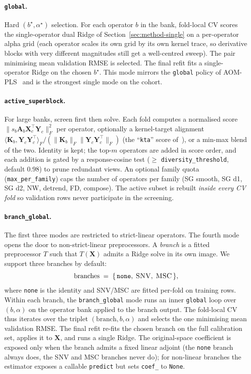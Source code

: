 \documentclass[11pt,a4paper]{article}
\newcommand{\Xmat}{\mathbf{X}}
\newcommand{\Yc}{\mathbf{Y}_{\!c}}
\newcommand{\Amat}{\mathbf{A}}
\newcommand{\Kmat}{\mathbf{K}}
\newcommand{\SNV}{\textsc{SNV}\xspace}
\newcommand{\MSC}{\textsc{MSC}\xspace}
\begin{document}
\paragraph{\texttt{global}.}
Hard $(b^\star,\alpha^\star)$ selection. For each operator $b$ in the
bank, fold-local CV scores the single-operator dual Ridge of
Section~\ref{sec:method-single} on a per-operator alpha grid (each
operator scales its own grid by its own kernel trace, so derivative
blocks with very different magnitudes still get a well-centred sweep).
The pair minimising mean validation RMSE is selected. The final refit
fits a single-operator Ridge on the chosen $b^\star$. This mode
mirrors the \texttt{global} policy of AOM-PLS~\citep{beurier2026aompls}
and is the strongest single mode on the cohort.

\paragraph{\texttt{active\_superblock}.}
For large banks, screen first then solve. Each fold computes a
normalised score
$\|s_b\Amat_b\Xmat_c^\top\Yc\|_F^2$ per operator, optionally a
kernel-target alignment
$\langle\Kmat_b,\Yc\Yc^\top\rangle_F/(\|\Kmat_b\|_F\|\Yc\Yc^\top\|_F)$
(the ``\texttt{kta}'' score
of~\citealt{cristianini2002kernel}), or a min-max blend of the two.
Identity is kept; the top-$m$ operators are added in score order, and
each addition is gated by a response-cosine test
($\geq$ \texttt{diversity\_threshold}, default $0.98$) to prune
redundant views. An optional family quota
(\texttt{max\_per\_family}) caps the number of operators per family
(SG smooth, SG d1, SG d2, NW, detrend, FD, compose). The active
subset is rebuilt \emph{inside every CV fold} so validation rows
never participate in the screening.

\paragraph{\texttt{branch\_global}.}
The first three modes are restricted to strict-linear operators. The
fourth mode opens the door to non-strict-linear preprocessors. A
\emph{branch} is a fitted preprocessor $T$ such that $T(\Xmat)$
admits a Ridge solve in its own image. We support three branches by
default:
\begin{equation}
\mathrm{branches} \;=\; \{\,\texttt{none},\;\SNV,\;\MSC\,\},
\end{equation}
where \texttt{none} is the identity and \SNV/\MSC are fitted
per-fold on training rows. Within each branch, the
\texttt{branch\_global} mode runs an inner \texttt{global} loop over
$(b,\alpha)$ on the operator bank applied to the branch output. The
fold-local CV thus iterates over the triplet
$(\mathrm{branch},b,\alpha)$ and selects the one minimising mean
validation RMSE. The final refit re-fits the chosen branch on the
full calibration set, applies it to $\Xmat$, and runs a single Ridge.
The original-space coefficient is exposed only when the branch admits
a fixed linear adjoint (the \texttt{none} branch always does, the SNV
and MSC branches never do); for non-linear branches the estimator
exposes a callable \texttt{predict} but sets \texttt{coef\_} to
\texttt{None}.
\end{document}
